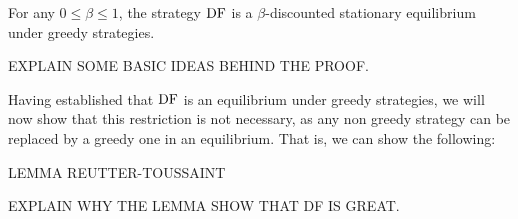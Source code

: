 \begin{mythm}%
For any $0 \leq \beta \leq 1$, the strategy $\text{\rm DF}$ is a $\beta$-discounted stationary equilibrium under greedy strategies. 
\end{mythm} 

EXPLAIN SOME BASIC IDEAS BEHIND THE PROOF.

Having established that $\text{\rm DF}$ is an equilibrium under greedy strategies, we will now show that this restriction is not necessary, as any non greedy strategy can be replaced by a greedy one in an equilibrium. That is, we can show the following:

LEMMA REUTTER-TOUSSAINT

EXPLAIN WHY THE LEMMA SHOW THAT DF IS GREAT.




